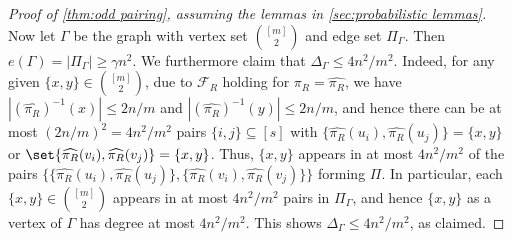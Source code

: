 \documentclass[11pt,reqno,oneside]{amsart}
\theoremstyle{definition}
\newcommand\wh[1]{\widehat{#1}}
\newcommand\1{\mathbf{1}}
\newcommand{\su}{\subseteq}
\let\leq\leqslant
\let\geq\geqslant
\begin{document}
\begin{proof}[Proof of \cref{thm:odd pairing}, assuming the lemmas in \cref{sec:probabilistic lemmas}]
    Now let $\Gamma$ be the graph with vertex set $\binom{[m]}{2}$ and edge set $\Pi_\Gamma$. Then $e(\Gamma)=|\Pi_\Gamma|\geq \gamma n^2$. We furthermore claim that $\Delta_\Gamma\leq 4n^2/m^2$. Indeed, for any given $\{x,y\}\in \binom{[m]}{2}$, due to $\mathcal F_R$ holding for $\pi_R=\wh{\pi_R}$, we have $|(\wh{\pi_R})^{-1}(x)|\leq 2n/m$ and $|(\wh{\pi_R})^{-1}(y)|\leq 2n/m$, and hence there can be at most $(2n/m)^2=4n^2/m^2$ pairs $\{i,j\}\su [s]$ with $\{\wh{\pi_R}(u_i),\wh{\pi_R}(u_j)\}=\{x,y\}$ or $\set{\wh{\pi_R}(v_i),\wh{\pi_R}(v_j)}=\{x,y\}$. Thus, $\{x,y\}$ appears in at most $4n^2/m^2$ of the pairs $\big\{\{\wh{\pi_R}(u_i),\wh{\pi_R}(u_j)\}, \{\wh{\pi_R}(v_i),\wh{\pi_R}(v_j)\}\big\}$ forming $\Pi$. In particular, each $\{x,y\}\in \binom{[m]}{2}$ appears in at most $4n^2/m^2$ pairs in $\Pi_\Gamma$, and hence $\{x,y\}$ as a vertex of $\Gamma$ has degree at most $4n^2/m^2$. This shows $\Delta_\Gamma\leq 4n^2/m^2$, as claimed.


\end{proof}
\end{document}
